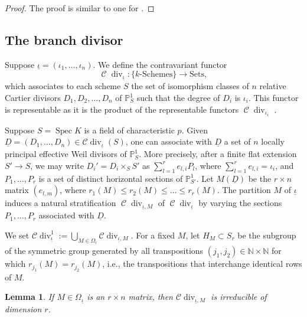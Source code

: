 \documentclass{compositio}
\newcommand{\huy}[1]{\todo[color=yellow]{HD: #1}}
\newtheorem{lemma}[theorem]{Lemma}
\theoremstyle{remark}
\theoremstyle{remark}
\DeclareMathOperator{\spec}{Spec}
\DeclareMathOperator{\divisor}{div}
\DeclareMathOperator{\C}{\mathcal{C}}
\begin{document}
\begin{proof}
The proof is similar to one for \cite[Lemma 3.1]{MR2985514}.
\end{proof}






\subsection{The branch divisor} 

Suppose $\underline{\iota}=(\iota_1, \ldots, \iota_n)$. We define the contravariant functor $$\C\divisor_{\underline{\iota}}: \{  k\text{-Schemes} \} \rightarrow {\text{Sets} },$$which associates to each scheme $S$ the set of isomorphism classes of $n$ relative Cartier divisors $D_1, D_2, \ldots, \allowbreak D_n$ of $\mathbb{P}^1_S$ such that the degree of $D_i$ is $\iota_i$. This functor is representable as it is the product of the representable functors $\C \divisor_{\iota_i}$ \cite{MR2985514}.

Suppose $S=\spec K$ is a field of characteristic $p$. Given $\underline{D}=(D_1, \ldots, D_n) \in \mathcal{C} \divisor_{\underline{\iota}}(S)$, one can associate with $\underline{D}$ a set of $n$ locally principal effective Weil divisors of $\mathbb{P}^1_S$. More precisely, after a finite flat extension $S' \rightarrow S$, we may write $D_i'=D_i \times_S S'$ as $\sum_{l=1}^{r} e_{l,i} P_l$, where $\sum_{l=1}^r e_{l,i} = \iota_i$, and ${P_1, \ldots, P_r }$ is a set of distinct horizontal sections of $\mathbb{P}^1_{S'}$. Let $M(\underline{D})$ be the $r \times n$ matrix $(e_{l,m})$, where $r_1(M) \le r_2(M) \le \ldots \le r_r(M)$. The partition $M$ of $\underline{\iota}$ induces a natural stratification $\C\divisor_{\underline{\iota}, M}$ of $\C\divisor_{\underline{\iota}}$ by varying the sections ${P_1, \ldots, P_r}$ associated with $\underline{D}$.

We set $\mathcal{C} \divisor_{\underline{\iota}}^1:=\bigcup_{M \in \Omega_{\underline{\iota}}} \mathcal{C} \divisor_{\underline{\iota},M}$. For a fixed $M$, let $H_M \subset S_{r}$ be the subgroup of the symmetric group generated by all transpositions $(j_1, j_2) \in \mathbb{N} \times \mathbb{N}$ for which $r_{j_1}(M)=r_{j_2}(M)$, i.e., the transpositions that interchange identical rows of $M$.


\begin{lemma}
\label{lemmadimstratamatrix}
If $M \in \Omega_{\underline{\iota}}$ is an $r \times n$ matrix, then $\mathcal{C}\divisor_{\underline{\iota},M}$ is irreducible of dimension $r$.
\end{lemma}
\end{document}
